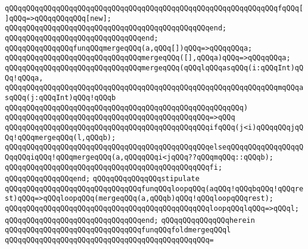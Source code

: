 \newline
\verb|qQQqqQQqqQQqqQQqqQQqqQQqqQQqqQQqqQQqqQQqqQQqqQQqqQQqqQQqqQQqqQQqfqQQq[]qQQq=>qQQqqQQqqQQq[new];|\newline
\verb|qQQqqQQqqQQqqQQqqQQqqQQqqQQqqQQqqQQqqQQqqQQqqQQqend;|\newline
\verb|qQQqqQQqqQQqqQQqqQQqqQQqqQQqqQQqend;|\newline
\newline
\newline
\verb|qQQqqQQqqQQqqQQqfunqQQqmergeqQQq(a,qQQq[])qQQq=>qQQqqQQqa;|\newline
\verb|qQQqqQQqqQQqqQQqqQQqqQQqqQQqqQQqmergeqQQq([],qQQqa)qQQq=>qQQqqQQqa;|\newline
\newline
\verb|qQQqqQQqqQQqqQQqqQQqqQQqqQQqqQQqmergeqQQq(qQQqlqQQqasqQQq(i:qQQqInt)qQQq!qQQqa,|\newline
\verb|qQQqqQQqqQQqqQQqqQQqqQQqqQQqqQQqqQQqqQQqqQQqqQQqqQQqqQQqqQQqqQQqmqQQqasqQQq(j:qQQqInt)qQQq!qQQqb|\newline
\verb|qQQqqQQqqQQqqQQqqQQqqQQqqQQqqQQqqQQqqQQqqQQqqQQqqQQqqQQq)|\newline
\verb|qQQqqQQqqQQqqQQqqQQqqQQqqQQqqQQqqQQqqQQqqQQqqQQq=>qQQq|\newline
\verb|qQQqqQQqqQQqqQQqqQQqqQQqqQQqqQQqqQQqqQQqqQQqqQQqifqQQq(j<i)qQQqqQQqjqQQq!qQQqmergeqQQq(l,qQQqb);|\newline
\verb|qQQqqQQqqQQqqQQqqQQqqQQqqQQqqQQqqQQqqQQqqQQqqQQqelseqQQqqQQqqQQqqQQqqQQqqQQqiqQQq!qQQqmergeqQQq(a,qQQqqQQqi<jqQQq??qQQqmqQQq::qQQqb);|\newline
\verb|qQQqqQQqqQQqqQQqqQQqqQQqqQQqqQQqqQQqqQQqqQQqqQQqfi;|\newline
\verb|qQQqqQQqqQQqqQQqend;|\newline
\newline
\verb|qQQqqQQqqQQqqQQqstipulate|\newline
\verb|qQQqqQQqqQQqqQQqqQQqqQQqqQQqqQQqfunqQQqloopqQQq(aqQQq!qQQqbqQQq!qQQqrest)qQQq=>qQQqloopqQQq(mergeqQQq(a,qQQqb)qQQq!qQQqloopqQQqrest);|\newline
\verb|qQQqqQQqqQQqqQQqqQQqqQQqqQQqqQQqqQQqqQQqqQQqqQQqloopqQQqlqQQq=>qQQql;|\newline
\verb|qQQqqQQqqQQqqQQqqQQqqQQqqQQqqQQqend;|\newline
\verb|qQQqqQQqqQQqqQQqherein|\newline
\verb|qQQqqQQqqQQqqQQqqQQqqQQqqQQqqQQqfunqQQqfoldmergeqQQql|\newline
\verb|qQQqqQQqqQQqqQQqqQQqqQQqqQQqqQQqqQQqqQQqqQQqqQQq=|\newline
